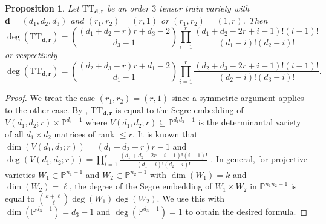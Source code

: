 \documentclass[12pt]{article}
\newtheorem{proposition}[theorem]{Proposition}
\theoremstyle{definition}
\numberwithin{theorem}{section}
\newcommand{\PP}{\mathbb{P}}
\begin{document}
\begin{proposition}
Let $\mathrm{TT}_{\mathbf{d}, \mathbf{r}}$ be an order $3$ tensor train variety with $\mathbf{d} =(d_1, d_2, d_3)$ and $(r_1,r_2) = (r,1)$ or $(r_1, r_2) = (1, r)$.  
 Then
 $$ \deg(\mathrm{TT}_{\mathbf{d}, \mathbf{r}}) = \binom{(d_1+d_2-r)r+d_3-2}{d_3-1}\prod_{i=1}^r \frac{(d_1+d_2-2r+i-1)! (i-1)!}{(d_1-i)! (d_2-i)!}$$
 or respectively
 $$ \deg(\mathrm{TT}_{\mathbf{d}, \mathbf{r}}) = \binom{(d_2+d_3-r)r+d_1-2}{d_1-1}\prod_{i=1}^r \frac{(d_2+d_3-2r+i-1)! (i-1)!}{(d_2-i)! (d_3-i)!}.$$
\end{proposition}
\begin{proof}
We treat the case $(r_1, r_2) = (r,1)$ since a symmetric argument applies to the other case. By \cite[Lemma 5.6]{BFHP25}, $\mathrm{TT}_{\mathbf{d}, \mathbf{r}}$ is equal to the Segre embedding of 
$V(d_1, d_2; r) \times \PP^{d_3-1}$ where $V(d_1,d_2;r) \subseteq \PP^{d_1d_2-1}$ is the determinantal variety of all $d_1 \times d_2$ matrices of rank $\leq r$. It is known that 
$\dim(V(d_1, d_2;r)) = (d_1+d_2-r)r-1$ \cite[Theorem 3.4.6]{BCRV22} and 
$\deg(V(d_1,d_2;r)) = \prod_{i=1}^r \frac{(d_1+d_2-2r+i-1)! (i-1)!}{(d_1-i)! (d_2-i)!}$ \cite[Theorem 4.4.2]{BCRV22}.  In general, 
for projective varieties $W_1 \subset \PP^{n_1-1}$
and $W_2 \subset \PP^{n_2-1}$ with $\dim(W_1) = k$
and $\dim(W_2)=\ell$, the degree of the Segre embedding of $W_1 \times W_2$ in $\PP^{n_1n_2-1}$ 
is equal to $\binom{k+\ell}{\ell} \deg(W_1)\deg(W_2)$. We use this with $\dim(\PP^{d_3-1})=d_3-1$ and 
$\deg(\PP^{d_3-1})=1$ to obtain the desired formula.  
\end{proof}
\end{document}
